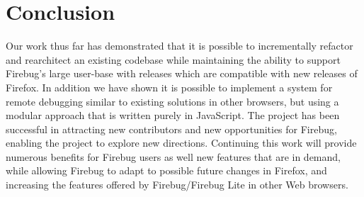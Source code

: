 \section{Conclusion}
Our work thus far has demonstrated that it is possible to incrementally refactor
and rearchitect an existing codebase while maintaining the ability to support
Firebug's large user-base with releases which are compatible with new releases
of Firefox. In addition we have shown it is possible to implement a system for
remote debugging similar to existing solutions in other browsers, but using a
modular approach that is written purely in JavaScript. The project has been
successful in attracting new contributors and new opportunities for Firebug,
enabling the project to explore new directions. Continuing this work will
provide numerous benefits for Firebug users as well new features that are in
demand, while allowing Firebug to adapt to possible future changes in Firefox,
and increasing the features offered by Firebug/Firebug Lite in other Web
browsers.
